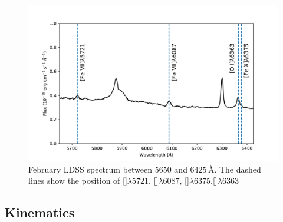 \documentclass[../thesis.tex]{subfiles}
\begin{document}
\begin{figure}
\centering
\includegraphics[width=\textwidth]{images/paper3/Fe_lines.pdf} 
\caption[]{February LDSS spectrum between $5650$ and $6425\,\si{\angstrom}$. The dashed lines show the position of []$\lambda5721$,  []$\lambda6087$, []$\lambda6375$,[]$\lambda6363$} 
\label{fig:fe_lines}
\end{figure} 

\subsection{Kinematics}
\label{sec:pap3_kinematics}
\end{document}
